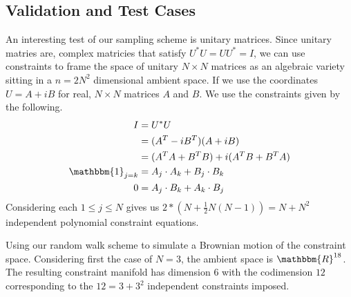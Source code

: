 
\subsection{Validation and Test Cases}

An interesting test of our sampling scheme is unitary matrices. Since unitary matries are, complex matricies that satisfy $U^*U = UU^* = I$, we can use constraints to frame the space of unitary $N \times N$ matrices as an algebraic variety sitting in a $n = 2N^2$ dimensional ambient space. If we use the coordinates $U = A + iB$ for real, $N \times N$ matrices $A$ and $B$. We use the constraints given by the following. 
\begin{align}
I &= U^*U \\
&= (A^T - iB^T)(A + iB) \\
&= (A^TA + B^TB) + i(A^TB + B^TA) \\
\mathbbm{1}_{j=k} &= A_j\cdot A_k + B_j\cdot B_k \\
0 &= A_j\cdot B_k + A_k \cdot B_j 
\end{align}
Considering each $1 \leq j \leq N$ gives us $2*(N + \frac{1}{2}N(N-1)) = N + N^2$ independent polynomial constraint equations. 


Using our random walk scheme to simulate a Brownian motion of the constraint space. Considering first the case of $N = 3$, the ambient space is $\mathbbm{R}^{18}$. The resulting constraint manifold has dimension $6$ with the codimension $12$ corresponding to the $12 = 3 + 3^2$ independent constraints imposed.  

